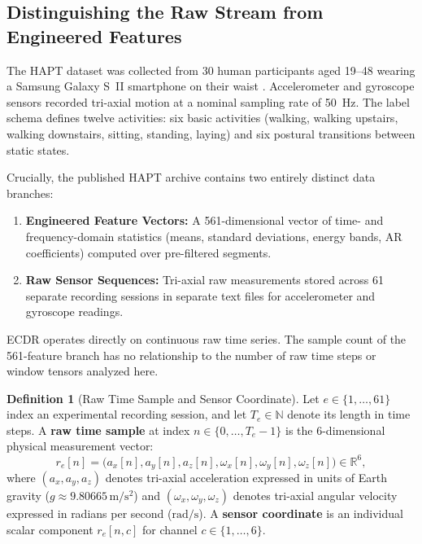 \documentclass[11pt,a4paper]{article}
\newcommand{\R}{\mathbb R}
\theoremstyle{definition}
\newtheorem{definition}[proposition]{Definition}
\begin{document}
\subsection{Distinguishing the Raw Stream from Engineered Features}
The HAPT dataset was collected from 30 human participants aged 19--48 wearing a Samsung Galaxy S~II smartphone on their waist \cite{uci}. Accelerometer and gyroscope sensors recorded tri-axial motion at a nominal sampling rate of 50~Hz. The label schema defines twelve activities: six basic activities (walking, walking upstairs, walking downstairs, sitting, standing, laying) and six postural transitions between static states.

Crucially, the published HAPT archive contains two entirely distinct data branches:
\begin{enumerate}
\item \textbf{Engineered Feature Vectors:} A 561-dimensional vector of time- and frequency-domain statistics (means, standard deviations, energy bands, AR coefficients) computed over pre-filtered segments.
\item \textbf{Raw Sensor Sequences:} Tri-axial raw measurements stored across 61 separate recording sessions in separate text files for accelerometer and gyroscope readings.
\end{enumerate}

ECDR operates directly on continuous raw time series. The sample count of the 561-feature branch has no relationship to the number of raw time steps or window tensors analyzed here.

\begin{definition}[Raw Time Sample and Sensor Coordinate]
Let $e \in \{1, \ldots, 61\}$ index an experimental recording session, and let $T_e \in \mathbb{N}$ denote its length in time steps. A \textbf{raw time sample} at index $n \in \{0, \ldots, T_e - 1\}$ is the 6-dimensional physical measurement vector:
\begin{equation}
r_e[n] = \big(a_x[n], a_y[n], a_z[n], \omega_x[n], \omega_y[n], \omega_z[n]\big) \in \R^6,
\end{equation}
where $(a_x, a_y, a_z)$ denotes tri-axial acceleration expressed in units of Earth gravity ($g \approx 9.80665\,\mathrm{m/s^2}$) and $(\omega_x, \omega_y, \omega_z)$ denotes tri-axial angular velocity expressed in radians per second ($\mathrm{rad/s}$). A \textbf{sensor coordinate} is an individual scalar component $r_e[n, c]$ for channel $c \in \{1, \ldots, 6\}$.
\end{definition}
\end{document}
